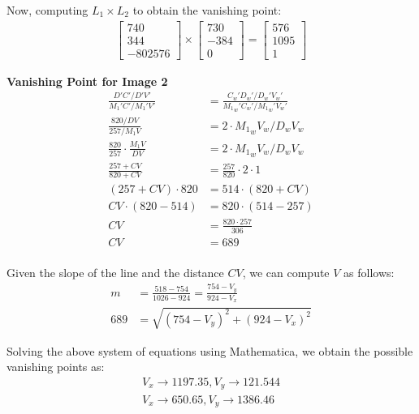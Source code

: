 \documentclass[12pt, oneside]{article}
\begin{document}
Now, computing $L_1 \times L_2$ to obtain the vanishing point:
\begin{align*}
    \begin{bmatrix}
        740  \\
        344 \\
        -802576 
    \end{bmatrix} \times 
    \begin{bmatrix}
        730  \\
        -384 \\
        0 
    \end{bmatrix}   = 
\begin{bmatrix}
    576  \\
    1095 \\
    1 
\end{bmatrix}
\end{align*}

\textbf{Vanishing Point for Image 2}
\begin{align*}
  \frac{D'C'/D'V'}{{M_1}'C'/{M_1}'V'} &= \frac{{C_w}'{D_w}'/{D_w}'{V_w}'}
                                        {{{M_1}_w}'{C_w}'/{{M_1}_w}'{V_w}'} \\
  \frac{820/DV}{257/M_1V}                 &= 2 \cdot {M_1}_wV_w/D_wV_w \\
  \frac{820}{257}\cdot \frac{M_1V}{DV}    &= 2 \cdot {M_1}_wV_w/D_wV_w \\
  \frac{257 + CV}{820 + CV}   &= \frac{257}{820}\cdot 2 \cdot 1 \\
  (257 + CV) \cdot 820   &= 514 \cdot (820 + CV) \\
  CV \cdot (820 - 514)   &= 820 \cdot (514 - 257)\\
  CV  &= \frac{820 \cdot 257} {306}\\
  CV  &= 689\\
\end{align*}

Given the slope of the line and the distance $CV$, we can compute $V$ as follows:
\begin{align}
    m &= \frac{518-754}{1026-924} = \frac{754-V_y}{924 - V_x}  \\
    689 &= \sqrt{(754-V_y)^2 + (924 - V_x)^2}
\end{align}

Solving the above system of equations using Mathematica, we obtain the possible
vanishing points as:
\begin{align*}
    {V_x\to 1197.35,V_y\to 121.544} \\
    {V_x\to 650.65,V_y\to 1386.46} 
\end{align*}
\end{document}
